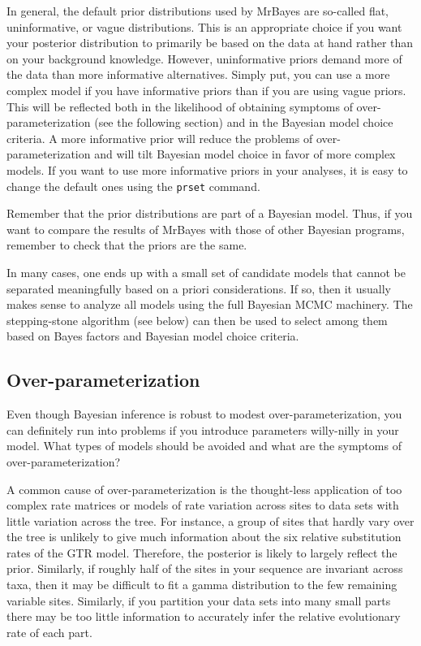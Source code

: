 \documentclass[12pt]{book}
\begin{document}
In general, the default prior distributions used by MrBayes are so-called flat, uninformative, or
vague distributions. This is an appropriate choice if you want your posterior distribution to
primarily be based on the data at hand rather than on your background knowledge. However,
uninformative priors demand more of the data than more informative alternatives. Simply put, you
can use a more complex model if you have informative priors than if you are using vague priors.
This will be reflected both in the likelihood of obtaining symptoms of over-parameterization (see
the following section) and in the Bayesian model choice criteria. A more informative prior will
reduce the problems of over-parameterization and will tilt Bayesian model choice in favor of more
complex models. If you want to use more informative priors in your analyses, it is easy to change
the default ones using the \texttt{prset} command.

Remember that the prior distributions are part of a Bayesian model. Thus, if you want to compare
the results of MrBayes with those of other Bayesian programs, remember to check that the priors are
the same.

In many cases, one ends up with a small set of candidate models that cannot be separated
meaningfully based on a priori considerations. If so, then it usually makes sense to analyze all
models using the full Bayesian MCMC machinery. The stepping-stone algorithm (see below) can then be
used to select among them based on Bayes factors and Bayesian model choice criteria.

\subsection{Over-parameterization}

Even though Bayesian inference is robust to modest over-parameterization, you can definitely run
into problems if you introduce parameters willy-nilly in your model. What types of models should be
avoided and what are the symptoms of over-parameterization?

A common cause of over-parameterization is the thought-less application of too complex rate
matrices or models of rate variation across sites to data sets with little variation across the
tree. For instance, a group of sites that hardly vary over the tree is unlikely to give much
information about the six relative substitution rates of the GTR model. Therefore, the posterior is
likely to largely reflect the prior. Similarly, if roughly half of the sites in your sequence are
invariant across taxa, then it may be difficult to fit a gamma distribution to the few remaining
variable sites. Similarly, if you partition your data sets into many small parts there may be too
little information to accurately infer the relative evolutionary rate of each part.
\end{document}
